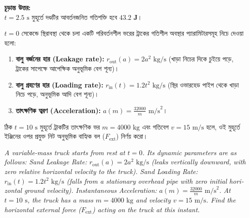 \documentclass[12pt, a4paper]{article}
\begin{document}
\begin{tcolorbox}[solutionbox={সমাধান (Solution)}]
\vspace{1em}
\begin{tcolorbox}[answerbox]
\textbf{চূড়ান্ত উত্তর:} \\
$t = 2.5\text{ s}$ মুহূর্তে দণ্ডটির আবর্তনজনিত গতিশক্তি হবে $\mathbf{43.2\text{ J}}$।
\end{tcolorbox}
\end{tcolorbox}

\begin{tcolorbox}[questionbox={প্রশ্ন (Question) 17}]
\noindent
$t = 0$ সেকেন্ডে স্থিরাবস্থা থেকে চলা একটি পরিবর্তনশীল ভরের ট্রাকের গতিশীল অবস্থার প্যারামিটারসমূহ নিচে দেওয়া হলো:
\begin{enumerate}
    \item \textbf{বালু বর্জনের হার (Leakage rate):} $r_{\text{out}}(a) = 2 a^2\text{ kg/s}$ (খাড়া নিচের দিকে চুইয়ে পড়ে, ট্রাকের সাপেক্ষে আপেক্ষিক অনুভূমিক বেগ শূন্য)।
    \item \textbf{বালু গ্রহণের হার (Loading rate):} $r_{\text{in}}(t) = 1.2 t^2\text{ kg/s}$ (স্থির ওভারহেড পাইপ থেকে খাড়া নিচে পড়ে, অনুভূমিক আদি বেগ শূন্য)।
    \item \textbf{তাৎক্ষণিক ত্বরণ (Acceleration):} $a(m) = \frac{32000}{m}\text{ m/s}^2$।
\end{enumerate}

\vspace{0.3em}
\noindent
ঠিক $t = 10\text{ s}$ মুহূর্তে ট্রাকটির তাৎক্ষণিক ভর $m = 4000\text{ kg}$ এবং গতিবেগ $v = 15\text{ m/s}$ হলে, ওই মুহূর্তে ইঞ্জিনের ওপর প্রযুক্ত নিট অনুভূমিক বাহ্যিক বল ($F_{\text{ext}}$) নির্ণয় করো।

\vspace{0.8em}
\begin{english}
\noindent\textit{\color{darkgray}
A variable-mass truck starts from rest at $t = 0$. Its dynamic parameters are as follows:
Sand Leakage Rate: $r_{\text{out}}(a) = 2 a^2\text{ kg/s}$ (leaks vertically downward, with zero relative horizontal velocity to the truck).
Sand Loading Rate: $r_{\text{in}}(t) = 1.2 t^2\text{ kg/s}$ (falls from a stationary overhead pipe with zero initial horizontal ground velocity).
Instantaneous Acceleration: $a(m) = \frac{32000}{m}\text{ m/s}^2$.
At $t = 10\text{ s}$, the truck has a mass $m = 4000\text{ kg}$ and velocity $v = 15\text{ m/s}$. Find the horizontal external force ($F_{\text{ext}}$) acting on the truck at this instant.
}
\end{english}
\end{tcolorbox}
\end{document}
